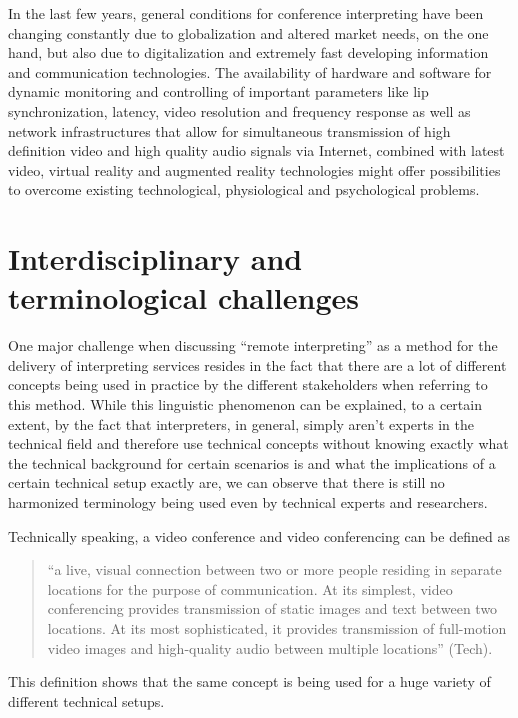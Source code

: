 \documentclass[output=paper]{langsci/langscibook}
\begin{document}
In the last few years, general conditions for conference interpreting have been changing constantly due to globalization and altered market needs, on the one hand, but also due to digitalization and extremely fast developing information and communication technologies. The availability of hardware and software for dynamic monitoring and controlling of important parameters like lip synchronization, latency, video resolution and frequency response as well as network infrastructures that allow for simultaneous transmission of high definition video and high quality audio signals via Internet, combined with latest video, virtual reality and augmented reality technologies might offer possibilities to overcome existing technological, physiological and psychological problems. 

\section{Interdisciplinary and terminological challenges}

One major challenge when discussing “remote interpreting” as a method for the delivery of interpreting services resides in the fact that there are a lot of different concepts being used in practice by the different stakeholders when referring to this method. While this linguistic phenomenon can be explained, to a certain extent, by the fact that interpreters, in general, simply aren’t experts in the technical field and therefore use technical concepts without knowing exactly what the technical background for certain scenarios is and what the implications of a certain technical setup exactly are, we can observe that there is still no harmonized terminology being used even by technical experts and researchers. 

Technically speaking, a video conference and video conferencing can be defined as 

\begin{quote}
	“a live, visual connection between two or more people residing in separate locations for the purpose of communication. At its simplest, video conferencing provides transmission of static images and text between two locations. At its most sophisticated, it provides transmission of full-motion video images and high-quality audio between multiple locations” (Tech\citealt{Target2017}).
\end{quote}

This definition shows that the same concept is being used for a huge variety of different technical setups.
\end{document}

